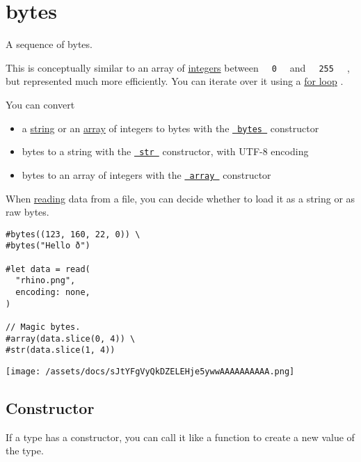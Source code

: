\section{\texorpdfstring{{ bytes }}{ bytes }}\label{summary}

A sequence of bytes.

This is conceptually similar to an array of
\href{/docs/reference/foundations/int/}{integers} between
\texttt{\ }{\texttt{\ 0\ }}\texttt{\ } and
\texttt{\ }{\texttt{\ 255\ }}\texttt{\ } , but represented much more
efficiently. You can iterate over it using a
\href{/docs/reference/scripting/\#loops}{for loop} .

You can convert

\begin{itemize}
\tightlist
\item
  a \href{/docs/reference/foundations/str/}{string} or an
  \href{/docs/reference/foundations/array/}{array} of integers to bytes
  with the \href{/docs/reference/foundations/bytes/}{\texttt{\ bytes\ }}
  constructor
\item
  bytes to a string with the
  \href{/docs/reference/foundations/str/}{\texttt{\ str\ }} constructor,
  with UTF-8 encoding
\item
  bytes to an array of integers with the
  \href{/docs/reference/foundations/array/}{\texttt{\ array\ }}
  constructor
\end{itemize}

When \href{/docs/reference/data-loading/read/}{reading} data from a
file, you can decide whether to load it as a string or as raw bytes.

\begin{verbatim}
#bytes((123, 160, 22, 0)) \
#bytes("Hello ð")

#let data = read(
  "rhino.png",
  encoding: none,
)

// Magic bytes.
#array(data.slice(0, 4)) \
#str(data.slice(1, 4))
\end{verbatim}

\texttt{[image: /assets/docs/sJtYFgVyQkDZELEHje5ywwAAAAAAAAAA.png]}

\subsection{\texorpdfstring{Constructor
{}}{Constructor }}\label{constructor}

\label{constructor-constructor-tooltip}
If a type has a constructor, you can call it like a function to create a
new value of the type.

